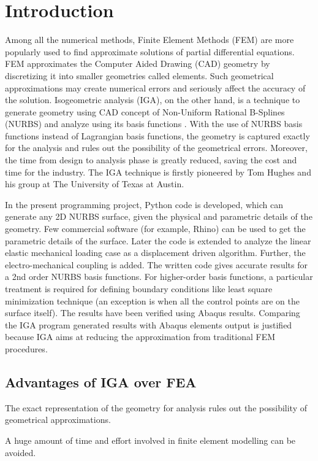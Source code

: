 \documentclass[11pt]{article}
\begin{document}
\clearpage

\newpage
\clearpage
\tableofcontents
\clearpage

\vspace*{1cm}

\section{Introduction}
Among all the numerical methods, Finite Element Methods (FEM) are more popularly used to find approximate solutions of partial differential equations. FEM approximates the Computer Aided Drawing (CAD) geometry by discretizing it into smaller geometries called elements. Such geometrical approximations may create numerical errors and seriously affect the accuracy of the solution. Isogeometric analysis (IGA), on the other hand, is a technique to generate geometry using CAD concept of Non-Uniform Rational B-Splines (NURBS) and analyze using its basis functions \cite{agrawal2019iga}. With the use of NURBS basis functions instead of Lagrangian basis functions, the geometry is captured exactly for the analysis and rules out the possibility of the geometrical errors. Moreover, the time from design to analysis phase is greatly reduced, saving the cost and time for the industry. The IGA technique is firstly pioneered by Tom Hughes and his group at The University of Texas at Austin.\\
\par
In the present programming project, Python code is developed, which can generate any 2D NURBS surface, given the physical and parametric details of the geometry. Few commercial software (for example, Rhino) can be used to get the parametric details of the surface. Later the code is extended to analyze the linear elastic mechanical loading case as a displacement driven algorithm. Further, the electro-mechanical coupling is added. The written code gives accurate results for a 2nd order NURBS basis functions. For higher-order basis functions, a particular treatment is required for defining boundary conditions like least square minimization technique (an exception is when all the control points are on the surface itself). The results have been verified using Abaqus results. Comparing the IGA program generated results with Abaqus elements output is justified because IGA aims at reducing the approximation from traditional FEM procedures.    

\subsection{Advantages of IGA over FEA}
\begin{description}[leftmargin=*]
	\item[$\bullet$]   The exact representation of the geometry for analysis rules
	out the possibility of geometrical approximations.
	\item[$\bullet$]   A huge amount of time and effort involved in finite element modelling
	can be avoided.
\end{description}
\end{document}

